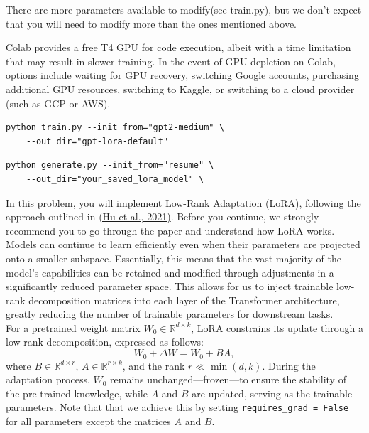 \documentclass[11pt,addpoints,answers]{exam}
\begin{document}
\begin{questions}
There are more parameters available to modify(see train.py), but we don't expect that you will need to modify more than the ones mentioned above.


Colab provides a free T4 GPU for code execution, albeit with a time limitation that may result in slower training. In the event of GPU depletion on Colab, options include waiting for GPU recovery, switching Google accounts, purchasing additional GPU resources, switching to Kaggle, or switching to a cloud provider (such as GCP or AWS).

\begin{lstlisting}
python train.py --init_from="gpt2-medium" \
    --out_dir="gpt-lora-default"
\end{lstlisting}

\begin{lstlisting}
python generate.py --init_from="resume" \
    --out_dir="your_saved_lora_model" \
\end{lstlisting}


\clearpage
{}


In this problem, you will implement Low-Rank Adaptation (LoRA), following the approach outlined in \href{https://arxiv.org/pdf/2106.09685.pdf}{(Hu et al., 2021)}. Before you continue, we strongly recommend you to go through the paper and understand how LoRA works. \\
Models can continue to learn efficiently even when their parameters are projected onto a smaller subspace. Essentially, this means that the vast majority of the model's capabilities can be retained and modified through adjustments in a significantly reduced parameter space. This allows for us to inject trainable low-rank decomposition matrices into each layer of the Transformer architecture, greatly reducing the number of trainable parameters for downstream tasks.\\
For a pretrained weight matrix \(W_0 \in \mathbb{R}^{d \times k}\), LoRA constrains its update through a low-rank decomposition, expressed as follows:
\[W_0 + \Delta W = W_0 + BA,\]
where \(B \in \mathbb{R}^{d \times r}\), \(A \in \mathbb{R}^{r \times k}\), and the rank  \(r \ll \min(d,k)\). During the adaptation process, \(W_0\) remains unchanged—frozen—to ensure the stability of the pre-trained knowledge, while \(A\) and \(B\) are updated, serving as the trainable parameters. Note that that we achieve this by setting \lstinline{requires_grad = False} for all parameters except the matrices \(A\) and \(B\).


\end{questions}
\end{document}
